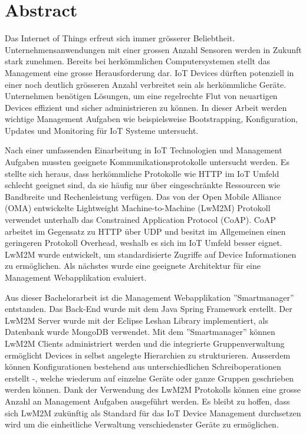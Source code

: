 \chapter*{Abstract}
Das Internet of Things erfreut sich immer grösserer Beliebtheit. Unternehmensanwendungen mit einer grossen Anzahl Sensoren werden in Zukunft stark zunehmen. Bereits bei herkömmlichen Computersystemen stellt das Management eine grosse Herausforderung dar. IoT Devices dürften potenziell in einer noch deutlich grösseren Anzahl verbreitet sein als herkömmliche Geräte. Unternehmen benötigen Lösungen, um eine regelrechte Flut von neuartigen Devices effizient und sicher administrieren zu können. In dieser Arbeit werden wichtige Management Aufgaben wie beispielsweise Bootstrapping, Konfiguration, Updates und Monitoring für IoT Systeme untersucht.

Nach einer umfassenden Einarbeitung in IoT Technologien und Management Aufgaben mussten geeignete Kommunikationsprotokolle untersucht werden. Es stellte sich heraus, dass herkömmliche Protokolle wie HTTP im IoT Umfeld schlecht geeignet sind, da sie häufig nur über eingeschränkte Ressourcen wie Bandbreite und Rechenleistung verfügen. Das von der Open Mobile Alliance (OMA) entwickelte Lightweight Machine-to-Machine (LwM2M) Protokoll verwendet unterhalb das Constrained Application Protocol (CoAP). CoAP arbeitet im Gegensatz zu HTTP über UDP und besitzt im Allgemeinen einen geringeren Protokoll Overhead, weshalb es sich im IoT Umfeld besser eignet. LwM2M wurde entwickelt, um standardisierte Zugriffe auf Device Informationen zu ermöglichen. Als nächstes wurde eine geeignete Architektur für eine Management Webapplikation evaluiert.

Aus dieser Bachelorarbeit ist die Management Webapplikation ''Smartmanager'' entstanden. Das Back-End wurde mit dem Java Spring Framework erstellt. Der LwM2M Server wurde mit der Eclipse Leshan Library implementiert, als Datenbank wurde MongoDB verwendet. Mit dem ''Smartmanager'' können LwM2M Clients administriert werden und die integrierte Gruppenverwaltung ermöglicht Devices in selbst angelegte Hierarchien zu strukturieren. Ausserdem können Konfigurationen bestehend aus unterschiedlichen Schreiboperationen erstellt -, welche wiederum auf einzelne Geräte oder ganze Gruppen geschrieben werden können. Dank der Verwendung des LwM2M Protokolls können eine grosse Anzahl an Management Aufgaben ausgeführt werden. Es bleibt zu hoffen, dass sich LwM2M zukünftig als Standard für das IoT Device Management durchsetzen wird um die einheitliche Verwaltung verschiedenster Geräte zu ermöglichen.
